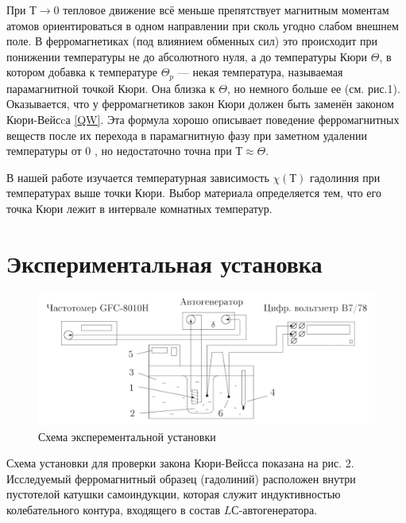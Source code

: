 \documentclass[12pt]{kiarticle}
\begin{document}
При $ Т \to 0 $ тепловое движение всё меньше препятствует магнитным моментам атомов ориентироваться в одном направлении при сколь
угодно слабом внешнем поле. В ферромагнетиках (под влиянием обменных сил) это происходит при понижении температуры не до абсолютного
нуля, а до температуры Кюри $ \Theta $, в котором добавка к температуре $ \Theta_p $ --- некая температура, называемая парамагнитной точкой Кюри. Она близка к $ \Theta $, но немного больше ее (см. рис.1). Оказывается, что у ферромагнетиков закон Кюри должен быть заменён законом Кюри-Вейсcа \eqref{QW}. Эта формула хорошо описывает поведение ферромагнитных  веществ после их перехода в парамагнитную фазу при заметном удалении температуры от 0 , но недостаточно точна при $ Т \approx \Theta$.

В нашей работе изучается температурная зависимость $ \chi(Т) $ гадолиния
при температурах выше точки Кюри. Выбор материала определяется
тем, что его точка Кюри лежит в интервале комнатных температур.

\section{Экспериментальная установка} 
\begin{figure}[h!]
	\centering
	\includegraphics[width=\linewidth]{pictures/342_stand}
	\caption{Схема эксперементальной установки}
	\label{fig:342stand}
\end{figure}

Схема установки для проверки закона Кюри-Вейсса показана на рис. 2. Исследуемый ферромагнитный образец (гадолиний) расположен внутри пустотелой катушки самоиндукции, которая служит индуктивностью колебательного контура, входящего в состав $ LС $-автогенератора. 
\end{document}
